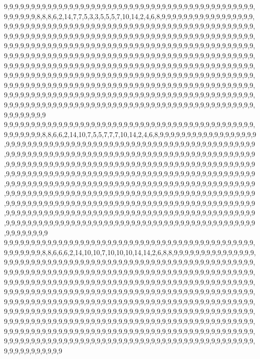 9,9,9,9,9,9,9,9,9,9,9,9,9,9,9,9,9,9,9,9,9,9,9,9,9,9,9,9,9,9,9,9,9,9,9,9,9,9,9,9,9,9,9,9,9,9,9,9,9,9,9,9,8,8,8,6,2,14,7,7,5,3,3,5,5,5,7,10,14,2,4,6,8,9,9,9,9,9,9,9,9,9,9,9,9,9,9,9,9,9,9,9,9,9,9,9,9,9,9,9,9,9,9,9,9,9,9,9,9,9,9,9,9,9,9,9,9,9,9,9,9,9,9,9,9,9,9,9,9,9,9,9,9,9,9,9,9,9,9,9,9,9,9,9,9,9,9,9,9,9,9,9,9,9,9,9,9,9,9,9,9,9,9,9,9,9,9,9,9,9,9,9,9,9,9,9,9,9,9,9,9,9,9,9,9,9,9,9,9,9,9,9,9,9,9,9,9,9,9,9,9,9,9,9,9,9,9,9,9,9,9,9,9,9,9,9,9,9,9,9,9,9,9,9,9,9,9,9,9,9,9,9,9,9,9,9,9,9,9,9,9,9,9,9,9,9,9,9,9,9,9,9,9,9,9,9,9,9,9,9,9,9,9,9,9,9,9,9,9,9,9,9,9,9,9,9,9,9,9,9,9,9,9,9,9,9,9,9,9,9,9,9,9,9,9,9,9,9,9,9,9,9,9,9,9,9,9,9,9,9,9,9,9,9,9,9,9,9,9,9,9,9,9,9,9,9,9,9,9,9,9,9,9,9,9,9,9,9,9,9,9,9,9,9,9,9,9,9,9,9,9,9,9,9,9,9,9,9,9,9,9,9,9,9,9,9,9,9,9,9,9,9,9,9,9,9,9,9,9,9,9,9,9,9,9,9,9,9,9,9,9,9,9,9,9,9,9,9,9,9,9,9,9,9,9,9,9,9,9,9,9,9,9,9,9,9,9,9,9,9,9,9,9,9,9,9,9,9,9,9,9,9,9,9,9,9,9,9,9,9,9,9,9,9,9,9,9,9,9,9,9,9,9,9,9,9,9,9,9,9,9,9,9,9,9,9,9,9,9,9,9,9,9,9,9,9,9,9,9,9,9,9,9,9,9,9,9,9,9,9,9,9,9,9,9,9,9,9,9,9,9,9,9,9,9,9,9,9,9,9,9,9
9,9,9,9,9,9,9,9,9,9,9,9,9,9,9,9,9,9,9,9,9,9,9,9,9,9,9,9,9,9,9,9,9,9,9,9,9,9,9,9,9,9,9,9,9,9,9,9,9,9,9,9,9,8,8,6,6,2,14,10,7,5,5,7,7,7,10,14,2,4,6,8,9,9,9,9,9,9,9,9,9,9,9,9,9,9,9,9,9,9,9,9,9,9,9,9,9,9,9,9,9,9,9,9,9,9,9,9,9,9,9,9,9,9,9,9,9,9,9,9,9,9,9,9,9,9,9,9,9,9,9,9,9,9,9,9,9,9,9,9,9,9,9,9,9,9,9,9,9,9,9,9,9,9,9,9,9,9,9,9,9,9,9,9,9,9,9,9,9,9,9,9,9,9,9,9,9,9,9,9,9,9,9,9,9,9,9,9,9,9,9,9,9,9,9,9,9,9,9,9,9,9,9,9,9,9,9,9,9,9,9,9,9,9,9,9,9,9,9,9,9,9,9,9,9,9,9,9,9,9,9,9,9,9,9,9,9,9,9,9,9,9,9,9,9,9,9,9,9,9,9,9,9,9,9,9,9,9,9,9,9,9,9,9,9,9,9,9,9,9,9,9,9,9,9,9,9,9,9,9,9,9,9,9,9,9,9,9,9,9,9,9,9,9,9,9,9,9,9,9,9,9,9,9,9,9,9,9,9,9,9,9,9,9,9,9,9,9,9,9,9,9,9,9,9,9,9,9,9,9,9,9,9,9,9,9,9,9,9,9,9,9,9,9,9,9,9,9,9,9,9,9,9,9,9,9,9,9,9,9,9,9,9,9,9,9,9,9,9,9,9,9,9,9,9,9,9,9,9,9,9,9,9,9,9,9,9,9,9,9,9,9,9,9,9,9,9,9,9,9,9,9,9,9,9,9,9,9,9,9,9,9,9,9,9,9,9,9,9,9,9,9,9,9,9,9,9,9,9,9,9,9,9,9,9,9,9,9,9,9,9,9,9,9,9,9,9,9,9,9,9,9,9,9,9,9,9,9,9,9,9,9,9,9,9,9,9,9,9,9,9,9,9,9,9,9,9,9,9,9,9,9,9,9,9,9,9,9,9,9,9,9,9,9,9,9,9,9,9,9,9,9,9,9,9,9,9,9,9,9,9,9
9,9,9,9,9,9,9,9,9,9,9,9,9,9,9,9,9,9,9,9,9,9,9,9,9,9,9,9,9,9,9,9,9,9,9,9,9,9,9,9,9,9,9,9,9,9,9,9,9,9,9,9,9,8,8,6,6,6,2,14,10,10,7,10,10,10,14,14,2,6,8,8,9,9,9,9,9,9,9,9,9,9,9,9,9,9,9,9,9,9,9,9,9,9,9,9,9,9,9,9,9,9,9,9,9,9,9,9,9,9,9,9,9,9,9,9,9,9,9,9,9,9,9,9,9,9,9,9,9,9,9,9,9,9,9,9,9,9,9,9,9,9,9,9,9,9,9,9,9,9,9,9,9,9,9,9,9,9,9,9,9,9,9,9,9,9,9,9,9,9,9,9,9,9,9,9,9,9,9,9,9,9,9,9,9,9,9,9,9,9,9,9,9,9,9,9,9,9,9,9,9,9,9,9,9,9,9,9,9,9,9,9,9,9,9,9,9,9,9,9,9,9,9,9,9,9,9,9,9,9,9,9,9,9,9,9,9,9,9,9,9,9,9,9,9,9,9,9,9,9,9,9,9,9,9,9,9,9,9,9,9,9,9,9,9,9,9,9,9,9,9,9,9,9,9,9,9,9,9,9,9,9,9,9,9,9,9,9,9,9,9,9,9,9,9,9,9,9,9,9,9,9,9,9,9,9,9,9,9,9,9,9,9,9,9,9,9,9,9,9,9,9,9,9,9,9,9,9,9,9,9,9,9,9,9,9,9,9,9,9,9,9,9,9,9,9,9,9,9,9,9,9,9,9,9,9,9,9,9,9,9,9,9,9,9,9,9,9,9,9,9,9,9,9,9,9,9,9,9,9,9,9,9,9,9,9,9,9,9,9,9,9,9,9,9,9,9,9,9,9,9,9,9,9,9,9,9,9,9,9,9,9,9,9,9,9,9,9,9,9,9,9,9,9,9,9,9,9,9,9,9,9,9,9,9,9,9,9,9,9,9,9,9,9,9,9,9,9,9,9,9,9,9,9,9,9,9,9,9,9,9,9,9,9,9,9,9,9,9,9,9,9,9,9,9,9,9,9,9,9,9,9,9,9,9,9,9,9,9,9,9,9,9,9,9,9,9,9,9,9,9,9,9,9,9,9,9,9,9,9,9,9
